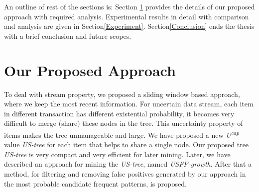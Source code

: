\documentclass[conference]{IEEEtran}
\begin{document}
An outline of rest of the sections is: Section \ref{proposedWork} provides the details of our proposed approach with required analysis. Experimental results in detail with comparison and analysis are given in Section\ref{Experiment}. Section\ref{Conclusion} ends the thesis with a brief conclusion and future scopes.
\section{Our Proposed Approach}\label{proposedWork}
To deal with stream property, we proposed a sliding window based approach, where we keep the most recent information. For uncertain data stream, each item in different transaction has different existential probability, it becomes very difficult to merge (share) these nodes in the tree. This uncertainty property of items makes the tree unmanageable and large. We have proposed a new \emph{U\textsuperscript{cap}} value \emph{US-tree} for each item that helps to share a single node. Our proposed tree \emph{US-tree} is very compact and very efficient for later mining. Later, we have described an approach for mining the \emph{US-tree}, named \emph{USFP-growth}. After that a method, for filtering and removing false positives generated by our approach in the most probable candidate frequent patterns, is proposed.
%
\end{document}
